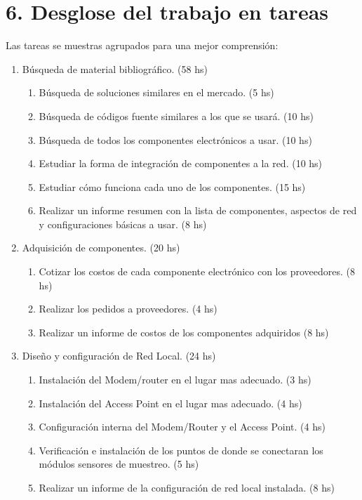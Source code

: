 \documentclass[11pt]{charter}
\begin{document}
\section{6. Desglose del trabajo en tareas}
\label{sec:wbs}
Las tareas se muestras agrupados para una mejor comprensión:
\begin{enumerate}
\item Búsqueda de material bibliográfico. (58 hs)
	\begin{enumerate}
	\item Búsqueda de soluciones similares en el mercado. (5 hs)
	\item Búsqueda de códigos fuente similares a los que se usará. (10 hs)
	\item Búsqueda de todos los componentes electrónicos a usar. (10 hs)
	\item Estudiar la forma de integración de componentes a la red. (10 hs)
	\item Estudiar cómo funciona cada uno de los componentes. (15 hs)
	\item Realizar un informe resumen con la lista de componentes, aspectos de red y configuraciones básicas a usar. (8 hs)
	\end{enumerate}
\item Adquisición de componentes. (20 hs)
	\begin{enumerate}
	\item Cotizar los costos de cada componente electrónico con los proveedores. (8 hs)
	\item Realizar los pedidos a proveedores. (4 hs)
	\item Realizar un informe de costos de los componentes adquiridos (8 hs)
	\end{enumerate}
\item Diseño y configuración de Red Local. (24 hs)
	\begin{enumerate}
	\item Instalación del Modem/router en el lugar mas adecuado. (3 hs)
	\item Instalación del Access Point en el lugar mas adecuado. (4 hs)
	\item Configuración interna del Modem/Router y el Access Point. (4 hs)
	\item Verificación e instalación de los puntos de donde se conectaran los módulos sensores de muestreo. (5 hs)
	\item Realizar un informe de la configuración de red local instalada. (8 hs)

\end{enumerate}
\end{enumerate}
\end{document}
